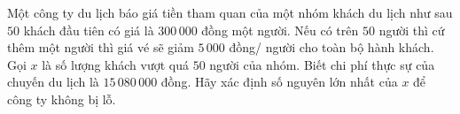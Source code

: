 



\begin{bt}%
	Một công ty du lịch báo giá tiền tham quan của một nhóm khách du lịch như sau $50$ khách đầu tiên có  giá là $300\,000$ đồng một người. Nếu có trên $50$ người thì cứ thêm một người thì giá vé sẽ giảm $5\,000$ đồng/ người cho toàn bộ hành khách. Gọi $x$ là số lượng khách vượt quá $50$ người của nhóm. Biết chi phí thực sự của chuyến du lịch là $15\,080\,000$ đồng. Hãy xác định số nguyên lớn nhất của $x$ để công ty không bị lỗ.
\end{bt}

